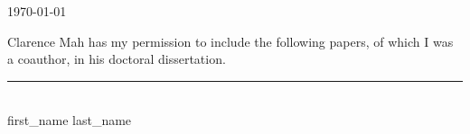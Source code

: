 \documentclass{article}
\begin{document}
\today

\bigskip
\bigskip
\bigskip

Clarence Mah has my permission to include the following papers, of
which I was a coauthor, in his doctoral dissertation.


\bigskip
\bigskip
\bigskip

\noindent
\rule{5cm}{1pt} \\
{{ first_name }} {{ last_name }}
\end{document}
